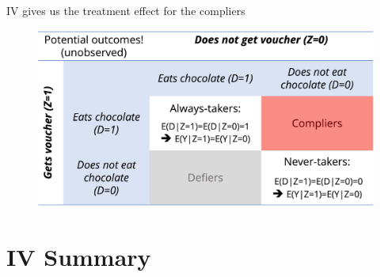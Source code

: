 \documentclass[11pt,xcolor=table]{beamer}
\begin{document}
\begin{frame}{IV gives us the treatment effect for the compliers}

\begin{figure}
\includegraphics[width=\textwidth]{figures/iv_table.png}
\end{figure}

\end{frame}





\section{IV Summary}
\end{document}
